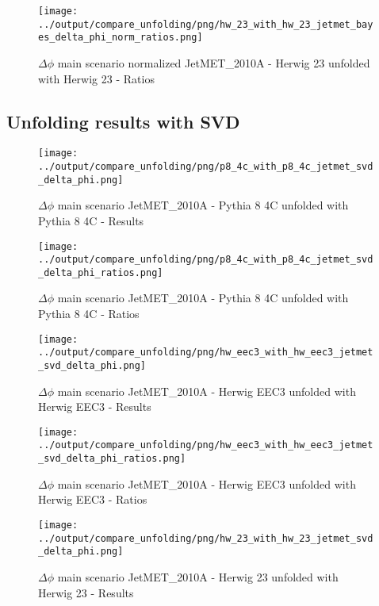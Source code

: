 \documentclass[11pt]{book}
\begin{document}
\begin{figure}[ht]
\centering
\texttt{[image: ../output/compare\_unfolding/png/hw\_23\_with\_hw\_23\_jetmet\_bayes\_delta\_phi\_norm\_ratios.png]}
\caption{$\Delta\phi$ main scenario normalized JetMET\_2010A - Herwig 23 unfolded with Herwig 23 - Ratios}
\label{hw_23_jetmet_delta_phi_norm_b}
\end{figure}



\clearpage
\subsection{Unfolding results with SVD}

\begin{figure}[ht]
\centering
\texttt{[image: ../output/compare\_unfolding/png/p8\_4c\_with\_p8\_4c\_jetmet\_svd\_delta\_phi.png]}
\caption{$\Delta\phi$ main scenario JetMET\_2010A - Pythia 8 4C unfolded with Pythia 8 4C - Results}
\label{p8_p8_jetmet_svd_delta_phi_a}
\end{figure}

\begin{figure}[ht]
\centering
\texttt{[image: ../output/compare\_unfolding/png/p8\_4c\_with\_p8\_4c\_jetmet\_svd\_delta\_phi\_ratios.png]}
\caption{$\Delta\phi$ main scenario JetMET\_2010A - Pythia 8 4C unfolded with Pythia 8 4C - Ratios}
\label{p8_p8_jetmet_svd_delta_phi_b}
\end{figure}

\begin{figure}[ht]
\centering
\texttt{[image: ../output/compare\_unfolding/png/hw\_eec3\_with\_hw\_eec3\_jetmet\_svd\_delta\_phi.png]}
\caption{$\Delta\phi$ main scenario JetMET\_2010A - Herwig EEC3 unfolded with Herwig EEC3 - Results}
\label{hw_eec3_hw_eec3_jetmet_svd_delta_phi_a}
\end{figure}

\begin{figure}[ht]
\centering
\texttt{[image: ../output/compare\_unfolding/png/hw\_eec3\_with\_hw\_eec3\_jetmet\_svd\_delta\_phi\_ratios.png]}
\caption{$\Delta\phi$ main scenario JetMET\_2010A - Herwig EEC3 unfolded with Herwig EEC3 - Ratios}
\label{hw_eec3_jetmet_svd_delta_phi_b}
\end{figure}

\begin{figure}[ht]
\centering
\texttt{[image: ../output/compare\_unfolding/png/hw\_23\_with\_hw\_23\_jetmet\_svd\_delta\_phi.png]}
\caption{$\Delta\phi$ main scenario JetMET\_2010A - Herwig 23 unfolded with Herwig 23 - Results}
\label{hw_23_hw_23_jetmet_svd_delta_phi_a}
\end{figure}
\end{document}
